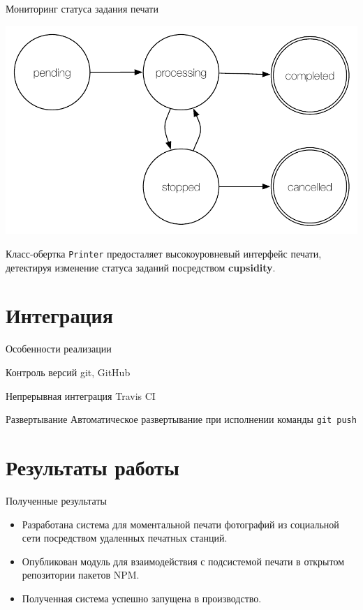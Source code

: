 \documentclass[utf-8]{beamer}
\begin{document}
\begin{frame}{Мониторинг статуса задания печати}
  \begin{center}
        \includegraphics[scale=0.5]{printer-class-simple.pdf}
  \end{center}
  Класс-обертка \texttt{Printer} предосталяет высокоуровневый интерфейс печати, детектируя изменение статуса заданий
  посредством \textbf{cupsidity}.
\end{frame}


\section{Интеграция}
\begin{frame}{Особенности реализации}

  \begin{block}{Контроль версий}
    git, GitHub
  \end{block}

  \begin{block}{Непрерывная интеграция}
    Travis CI
  \end{block}


  \begin{block}{Развертывание}
    Автоматическое развертывание при исполнении команды \texttt{git push}
  \end{block}

\end{frame}


\section{Результаты работы}
\begin{frame}{Полученные результаты}
  \begin{itemize}
    \item Разработана система для моментальной печати фотографий из социальной сети посредством
      удаленных печатных станций.\\[0.4cm]

    \item Опубликован модуль для взаимодействия с подсистемой печати в открытом репозитории пакетов
      NPM.\\[0.4cm]

    \item Полученная система успешно запущена в производство.
  \end{itemize}
\end{frame}
\end{document}
